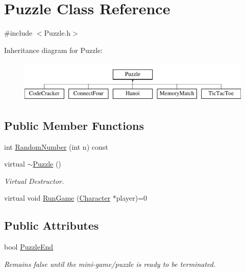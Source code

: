 \hypertarget{classPuzzle}{\section{Puzzle Class Reference}
\label{classPuzzle}
}


{\ttfamily \#include $<$Puzzle.\-h$>$}

Inheritance diagram for Puzzle\-:\begin{figure}[H]
\begin{center}
\leavevmode
\includegraphics[height=2.000000cm]{classPuzzle}
\end{center}
\end{figure}
\subsection*{Public Member Functions}
\begin{DoxyCompactItemize}
\item 
int \hyperlink{classPuzzle_ad0be5c887460d0b386bf5d97264f0c24}{Random\-Number} (int n) const 
\item 
virtual \hyperlink{classPuzzle_a4319df1536a07cd1aaf23b27aeb53579}{$\sim$\-Puzzle} ()
\begin{DoxyCompactList}\small\item\em Virtual Destructor. \end{DoxyCompactList}\item 
virtual void \hyperlink{classPuzzle_a134875b96b18d9963d2b018fd14e7ab9}{Run\-Game} (\hyperlink{classCharacter}{Character} $\ast$player)=0
\end{DoxyCompactItemize}
\subsection*{Public Attributes}
\begin{DoxyCompactItemize}
\item 
bool \hyperlink{classPuzzle_a965ad54e9f7340c3cad944fc82c61a2b}{Puzzle\-End}
\begin{DoxyCompactList}\small\item\em Remains false until the mini-\/game/puzzle is ready to be terminated. \end{DoxyCompactList}\end{DoxyCompactItemize}
